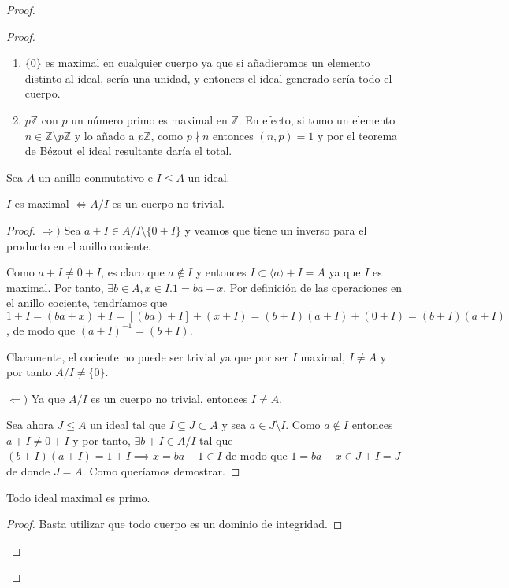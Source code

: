 \begin{proof}
\begin{proof}
\begin{example}
\begin{enumerate}
\item $\{0\}$ es maximal en cualquier cuerpo ya que si añadieramos un elemento distinto al ideal, sería una unidad, y entonces el ideal generado sería todo el cuerpo.

\item $p\mathbb{Z}$ con $p$ un número primo es maximal en $\mathbb{Z}$. En efecto, si tomo un elemento $n \in \mathbb{Z} \setminus p\mathbb{Z}$ y lo añado a $p\mathbb{Z}$, como $p \nmid n$ entonces $(n,p) = 1$ y por el teorema de Bézout el ideal resultante daría el total. 
\end{enumerate}
\end{example}

\begin{proposition}
Sea $A$ un anillo conmutativo e $I \le A$ un ideal.

$I$ es maximal $\iff A/I$ es un cuerpo no trivial. 
\end{proposition}
\begin{proof}
$\Rightarrow)$ Sea $a+I \in A/I \setminus \{0+I\}$ y veamos que tiene un inverso para el producto en el anillo cociente. 

Como $a+I \neq 0+I$, es claro que $a \notin I$ y entonces $I \subset \langle a \rangle + I = A$ ya que $I$ es maximal. Por tanto, $\exists b \in A,x \in I.1 = ba+x$. Por definición de las operaciones en el anillo cociente, tendríamos que $1 + I = (ba+x) + I = [(ba)+I] + (x+I) = (b+I)(a+I) + (0+I) = (b+I)(a+I)$, de modo que $(a+I)^{-1} = (b+I)$.

Claramente, el cociente no puede ser trivial ya que por ser $I$ maximal, $I \neq A$ y por tanto $A/I \neq \{0\}$.

$\Leftarrow)$ Ya que $A/I$ es un cuerpo no trivial, entonces $I \neq A$. 

Sea ahora $J \le A$ un ideal tal que $I \subseteq J \subset A$ y sea $a \in J \setminus I$. Como $a \notin I$ entonces $a + I \neq 0 + I$ y por tanto, $\exists b+I \in A/I$ tal que $(b+I)(a+I) = 1+I \implies x = ba - 1 \in I$ de modo que $1 = ba-x \in J+I = J$ de donde $J = A$. Como queríamos demostrar. 
\end{proof}

\begin{corollary}
Todo ideal maximal es primo.
\end{corollary}
\begin{proof}
Basta utilizar que todo cuerpo es un dominio de integridad. 
\end{proof}



\end{proof}
\end{proof}
